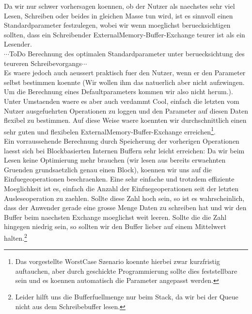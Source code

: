 \documentclass[10pt,a4paper]{article}
\begin{document}
Da wir nur schwer vorhersagen koennen, ob der Nutzer als naechstes sehr viel Lesen, Schreiben oder beides in gleichen Masse tun wird, ist es sinnvoll einen Standardparameter festzulegen, wobei wir wenn moeglichst beruecksichtigen sollten, dass ein Schreibender ExternalMemory-Buffer-Exchange teurer ist als ein Lesender.\\
$\cdots$ToDo Berechnung des optimalen Standardparameter unter beruecksichtung des teureren Schreibevorgangs$\cdots$\\
Es waere jedoch auch aeussert praktisch fuer den Nutzer, wenn er den Parameter selbst bestimmen koennte (Wir wollen ihm das natuerlich aber nicht aufzwingen. Um die Berechnung eines Defaultparameters kommen wir also nicht herum.). Unter Umstaenden waere es aber auch verdammt Cool, einfach die letzten vom Nutzer ausgefuehrten Operationen zu loggen und  den Parameter auf diesen Daten flexibel zu bestimmen. Auf diese Weise waere koennten wir durchschnittlich einen sehr guten und flexibelen ExternalMemory-Buffer-Exchange erreichen\footnote{Das vorgestellte WorstCase Szenario koennte hierbei zwar kurzfristig auftauchen, aber durch geschickte Programmierung sollte dies feststellbare sein und es koennen automatisch die Parameter angepasst werden.}.\\
Ein vorraussehende Berechnung durch Speicherung der vorherigen Operationen laesst sich bei Blockbasierten Internen Buffern sehr leicht erreichen: Da wir beim Lesen keine Optimierung mehr brauchen (wir lesen aus bereits erwaehnten Gruenden grundsaetzlich genau einen Block), koennen wir uns auf die Einfuegeoperationen beschraenken. Eine sehr einfache und trotzdem effiziente Moeglichkeit ist es, einfach die Anzahl der Einfuegeoperationen seit der letzten Ausleseoperation zu zaehlen. Sollte diese Zahl hoch sein, so ist es wahrscheinlich, dass der Anwender gerade eine grosse Menge Daten zu schreiben hat und wir den Buffer beim naechsten Exchange moeglichst weit leeren. Sollte die die Zahl hingegen niedrig sein, so sollten wir den Buffer lieber auf einem Mittelwert halten.\footnote{Leider hilft uns die Bufferfuellmenge nur beim Stack, da wir bei der Queue nicht aus dem Schreibebuffer lesen.}
\end{document}
